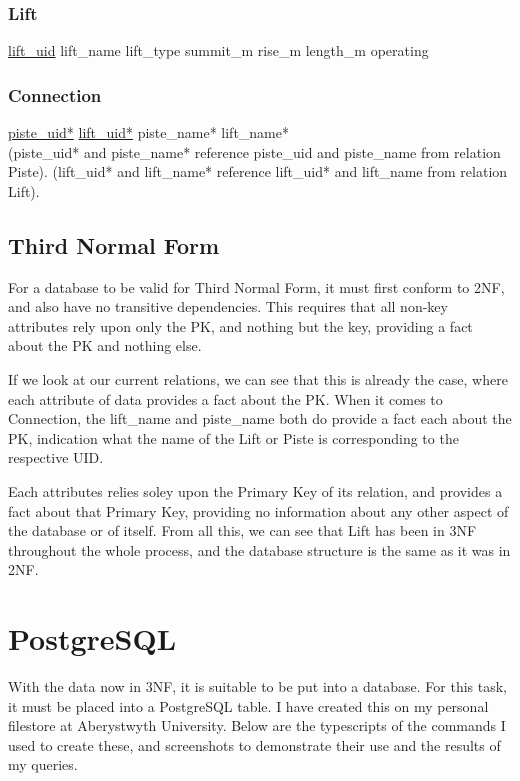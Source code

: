 \documentclass[11pt]{scrartcl} %
\begin{document}
\subsubsection{Lift}
\underline{lift\_uid}\newline
lift\_name\newline
lift\_type\newline
summit\_m\newline
rise\_m\newline
length\_m\newline
operating

\subsubsection{Connection}
\underline{piste\_uid*}\newline
\underline{lift\_uid*}\newline
piste\_name*\newline
lift\_name*\\[0.3cm]
(piste\_uid* and piste\_name* reference piste\_uid and piste\_name from relation Piste).
(lift\_uid* and lift\_name* reference lift\_uid* and lift\_name from relation Lift).

\subsection{Third Normal Form}
For a database to be valid for Third Normal Form, it must first conform to 2NF, and also have no transitive dependencies. This requires that all non-key attributes rely upon only the PK, and nothing but the key, providing a fact about the PK and nothing else. 

If we look at our current relations, we can see that this is already the case, where each attribute of data provides a fact about the PK. When it comes to Connection, the lift\_name and piste\_name both do provide a fact each about the PK, indication what the name of the Lift or Piste is corresponding to the respective UID.

Each attributes relies soley upon the Primary Key of its relation, and provides a fact about that Primary Key, providing no information about any other aspect of the database or of itself. From all this, we can see that Lift has been in 3NF throughout the whole process, and the database structure is the same as it was in 2NF.

\newpage

\section{PostgreSQL}
With the data now in 3NF, it is suitable to be put into a database. For this task, it must be placed into a PostgreSQL table. I have created this on my personal filestore at Aberystwyth University. Below are the typescripts of the commands I used to create these, and screenshots to demonstrate their use and the results of my queries.
\end{document}
